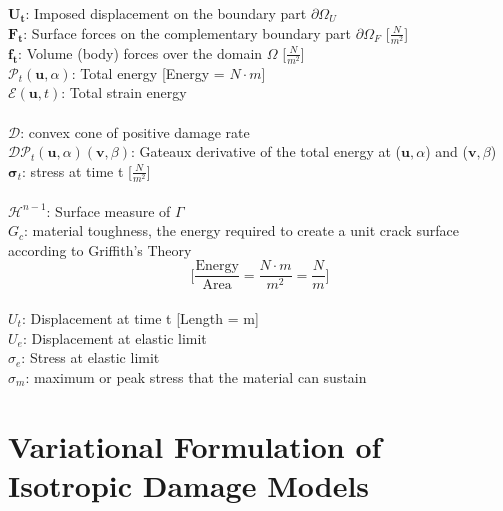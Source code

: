 \documentclass[12pt,3p]{article}
\numberwithin{equation}{section}
\begin{document}
$\mathbf{U_t}$: Imposed displacement on the boundary part $\partial \Omega_U$ \\
$\mathbf{F_t}$: Surface forces on the complementary boundary part $\partial \Omega_F$ [$\frac{N}{m^2}$]  \\
$\mathbf{f_t}$: Volume (body) forces over the domain $\Omega$ [$\frac{N}{m^2}$] \\
$\mathcal{P}_t (\mathbf{u}, \alpha) $: Total energy [Energy = $N \cdot m$] \\
$\mathcal{E} (\mathbf{u}, t)$: Total strain energy \\ \\
$\mathcal{D}$: convex cone of positive damage rate \\
$\mathcal{D} \mathcal{P}_t (\mathbf{u}, \alpha) (\mathbf{v}, \beta)$: Gateaux derivative of the total energy at ($ \mathbf{u}, \alpha$) and ($\mathbf{v}, \beta$) \\
$\boldsymbol{\sigma}_{t}$: stress at time t [$\frac{N}{m^2}$] \\ \\
\(\mathcal{H}^{n-1}\): Surface measure of $\Gamma$ \\
$G_c$: material toughness, the energy required to create a unit crack surface according to Griffith's Theory
\begin{equation*}
\bigg[ \frac{\text{Energy}}{\text{Area}} = \frac{N \cdot m }{m^2} = \frac{N}{m} \bigg] 
\end{equation*} \\
$U_t$: Displacement at time t [Length = m] \\
$U_e$: Displacement at elastic limit \\
$\sigma_e$: Stress at elastic limit \\
$\sigma_m$: maximum or peak stress that the material can sustain

\newpage
\section{Variational Formulation of Isotropic Damage Models}
\end{document}
